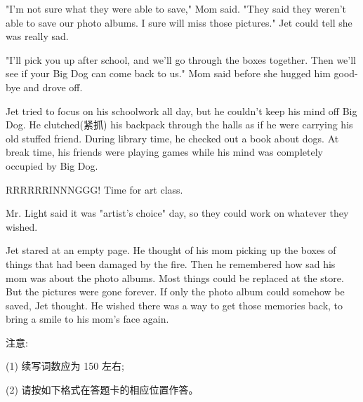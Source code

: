\documentclass{英语试卷}
\begin{document}
\par "I'm not sure what they were able to save," Mom said. "They said they weren't able to save our photo albums. I sure will miss those pictures." Jet could tell she was really sad.\par
\par "I'll pick you up after school, and we'll go through the boxes together. Then we'll see if your Big Dog can come back to us." Mom said before she hugged him good-bye and drove off.\par
\par Jet tried to focus on his schoolwork all day, but he couldn't keep his mind off Big Dog. He clutched(紧抓) his backpack through the halls as if he were carrying his old stuffed friend. During library time, he checked out a book about dogs. At break time, his friends were playing games while his mind was completely occupied by Big Dog.\par
\par RRRRRRINNNGGG! Time for art class.\par
\par Mr. Light said it was "artist's choice" day, so they could work on whatever they wished.\par
\par Jet stared at an empty page. He thought of his mom picking up the boxes of things that had been damaged by the fire. Then he remembered how sad his mom was about the photo albums. Most things could be replaced at the store. But the pictures were gone forever. If only the photo album could somehow be saved, Jet thought. He wished there was a way to get those memories back, to bring a smile to his mom's face again.\par
\par 注意:\par
\par (1) 续写词数应为 150 左右;\par
\par (2) 请按如下格式在答题卡的相应位置作答。\par
{}
\end{document}
